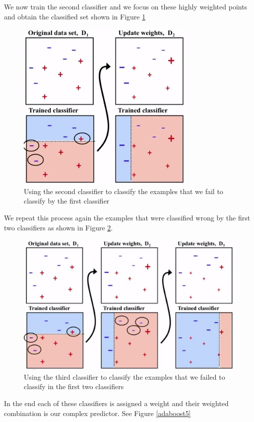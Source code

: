 \documentclass[11pt,oneside,reqno]{amsart}
\theoremstyle{definition}
\theoremstyle{definition}
\theoremstyle{remark}
\numberwithin{equation}{section}
\numberwithin{equation}{section}
\begin{document}
We now train the second classifier and we focus on these highly weighted points and obtain the classified set shown in Figure \ref{adaboost3}
\begin{figure}[H]
  \centering
   {\includegraphics[scale=0.8]{boosting_4}
   \caption{Using the second classifier to classify the examples that we fail to classify by the first classifier}
  \label{adaboost3}}
\end{figure}
We repeat this process again the examples that were classified wrong by the first two classifiers as shown in Figure \ref{adaboost4}.
\begin{figure}[H]
  \centering
   {\includegraphics[scale=0.8]{boosting_5}
   \caption{Using the third classifier to classify the examples that we failed to classify in the first two classifiers}
  \label{adaboost4}}
\end{figure}
In the end each of these classifiers is assigned a weight and their weighted combination is our complex predictor. See Figure \ref{adaboost5}
\end{document}
